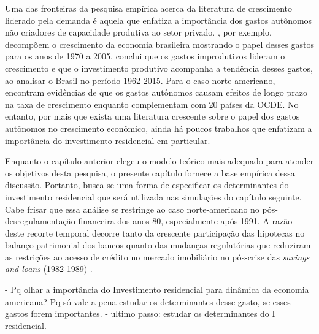 Uma das fronteiras da pesquisa empírica acerca da literatura de crescimento liderado pela demanda é aquela que enfatiza a importância dos gastos autônomos não criadores de capacidade produtiva ao setor privado. \textcite{freitas_pattern_2013}, por exemplo, decompõem o crescimento da economia brasileira mostrando o papel desses gastos para os anos de  1970 a 2005. \textcite{braga_investment_2018} conclui que os gastos improdutivos lideram o crescimento e que o investimento produtivo acompanha a tendência desses gastos, ao analisar o Brasil no período 1962-2015. Para o caso norte-americano, \textcite{girardi_long-run_2016} encontram evidências de que os gastos autônomos causam efeitos de longo prazo na taxa de crescimento enquanto \textcite{girardi_autonomous_2018} complementam com 20 países da OCDE. No entanto, por mais que exista uma literatura crescente sobre o papel dos gastos autônomos no crescimento econômico, ainda há poucos trabalhos que enfatizam a importância do investimento residencial em particular. 

Enquanto o capítulo anterior elegeu o modelo teórico mais adequado para atender os objetivos desta pesquisa, o presente capítulo fornece a base empírica dessa discussão. Portanto, busca-se uma forma de especificar os determinantes do investimento residencial que será utilizada nas simulações do capítulo seguinte. 
Cabe frisar que essa análise se restringe ao caso norte-americano no pós-desregulamentação financeira dos anos 80, especialmente após 1991. 
A razão deste recorte temporal decorre tanto da crescente participação das hipotecas no balanço patrimonial dos bancos \cite{jorda_great_2014} quanto das mudanças regulatórias que reduziram as restrições ao acesso de crédito no mercado imobiliário no pós-crise das \textit{savings and loans} (1982-1989) \cites{linneman_impacts_1989}{duca_empirical_1991}{federal_deposit_insurance_corporation_savings_1997}. 


- Pq olhar a importância do Investimento residencial para dinâmica da economia americana? Pq só vale a pena estudar os determinantes desse gasto, se esses gastos forem importantes.
- ultimo passo: estudar os determinantes do I residencial. 

